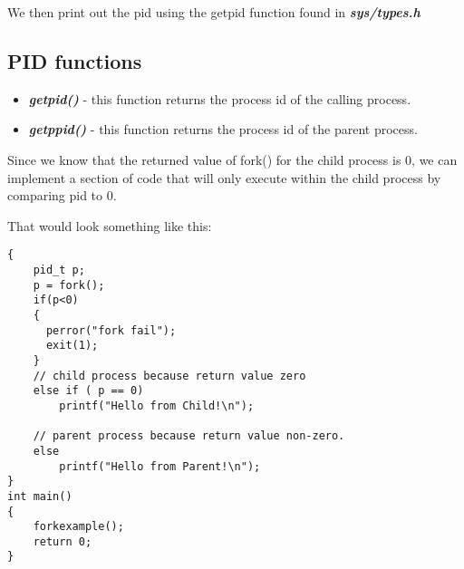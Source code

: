 \documentclass{report}
\begin{document}
\noindent We then print out the pid using the getpid function found in \textit{\textbf{sys/types.h}}
\subsection{PID functions}
\begin{itemize}
  \item \textit{\textbf{getpid()}} - this function returns the process id of the calling process.
  \item \textit{\textbf{getppid()}} - this function returns the process id of the parent process.
\end{itemize}
\bigbreak \noindent
Since we know that the returned value of fork() for the child process is 0, we can implement a section of code that will only execute within the child process by comparing pid to 0. \vspace{1.5mm}

\noindent That would look something like this:

\begin{verbatim}
{
    pid_t p;
    p = fork();
    if(p<0)
    {
      perror("fork fail");
      exit(1);
    }
    // child process because return value zero
    else if ( p == 0)
        printf("Hello from Child!\n");
 
    // parent process because return value non-zero.
    else
        printf("Hello from Parent!\n");
}
int main()
{
    forkexample();
    return 0;
}
\end{verbatim}
\end{document}
